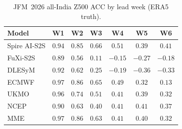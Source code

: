 \begin{table}[t]
  \centering
  \caption{JFM~2026 all-India Z500 ACC by lead week (ERA5 truth).}
  \label{tab:jfm_acc_z500}
  \small
  \begin{tabular}{lcccccc}
    \toprule
    Model & W1 & W2 & W3 & W4 & W5 & W6 \\
    \midrule
    Spire AI-S2S   & $0.94$ & $0.85$ & $\mathbf{0.66}$ & $\mathbf{0.51}$ & $0.39$ & $\mathbf{0.41}$ \\
FuXi-S2S       & $0.89$ & $0.56$ & $0.11$ & $-0.15$ & $-0.27$ & $-0.18$ \\
DLESyM         & $0.92$ & $0.62$ & $0.25$ & $-0.19$ & $-0.36$ & $-0.33$ \\
ECMWF          & $\mathbf{0.97}$ & $\mathbf{0.86}$ & $0.65$ & $0.49$ & $0.32$ & $0.13$ \\
UKMO           & $0.96$ & $0.74$ & $0.51$ & $0.41$ & $0.39$ & $0.32$ \\
NCEP           & $0.90$ & $0.63$ & $0.40$ & $0.41$ & $\mathbf{0.41}$ & $0.37$ \\
MME            & $0.97$ & $0.86$ & $0.63$ & $0.41$ & $0.40$ & $0.32$ \\
    \bottomrule
  \end{tabular}
\end{table}
